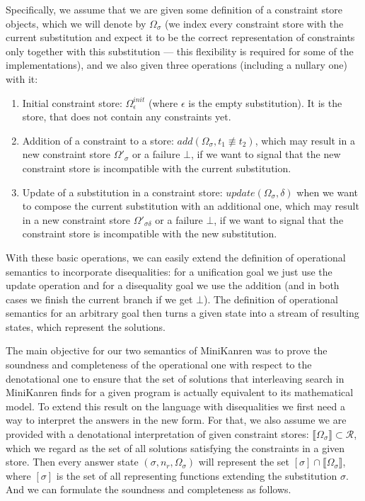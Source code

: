 \documentclass[submission,copyright,creativecommons]{eptcs}
\newcommand{\sembr}[1]{\llbracket{#1}\rrbracket}
\newcommand{\diseq}{\not\equiv}
\newcommand{\reprfunset}{\mathcal{R}}
\newcommand{\cstore}{\Omega}
\newcommand{\cstoreinit}{\cstore_\epsilon^{init}}
\newcommand{\csadd}[3]{add(#1, #2 \diseq #3)}  %
\newcommand{\csupdate}[2]{update(#1, #2)}  %
\begin{document}
Specifically, we assume that we are given some definition of a constraint store objects, which we will denote by $\cstore_\sigma$ (we index every constraint store with
the current substitution and expect it to be the correct representation of constraints only together with this substitution --- this flexibility is required for some
of the implementations), and we also given three operations (including a nullary one) with it:

\begin{enumerate}
\item Initial constraint store: $\cstoreinit$ (where $\epsilon$ is the empty substitution). It is the store, that does not contain any constraints yet.
\item Addition of a constraint to a store: $\csadd{\cstore_\sigma}{t_1}{t_2}$, which may result in a new constraint store $\cstore'_\sigma$ or a failure $\bot$,
  if we want to signal that the new constraint store is incompatible with the current substitution.
\item Update of a substitution in a constraint store: $\csupdate{\cstore_\sigma}{\delta}$ when we want to compose the current substitution with an additional
  one, which may result in a new constraint store $\cstore'_{\sigma \delta}$ or a failure $\bot$, if we want to signal that the constraint store is incompatible
  with the new substitution.
\end{enumerate}

With these basic operations, we can easily extend the definition of operational semantics to incorporate disequalities: for a unification goal we just use the
update operation and for a disequality goal we use the addition (and in both cases we finish the current branch if we get $\bot$). The definition of operational
semantics for an arbitrary goal then turns a given state into a stream of resulting states, which represent the solutions.

The main objective for our two semantics of MiniKanren was to prove the soundness and completeness of the operational one with respect to the denotational one to
ensure that the set of solutions that interleaving search in MiniKanren finds for a given program is actually equivalent to its mathematical model. To extend this
result on the language with disequalities we first need a way to interpret the answers in the new form. For that, we also assume we are provided with a denotational
interpretation of given constraint stores: $\sembr{\cstore_\sigma} \subset \reprfunset$, which we regard as the set of all solutions satisfying the constraints in a
given store. Then every answer state $(\sigma, n_r, \cstore_\sigma)$ will represent the set $[\sigma] \cap \sembr{\cstore_\sigma}$, where $[\sigma]$ is the set of
all representing functions extending the substitution $\sigma$. And we can formulate the soundness and completeness as follows.
\end{document}

